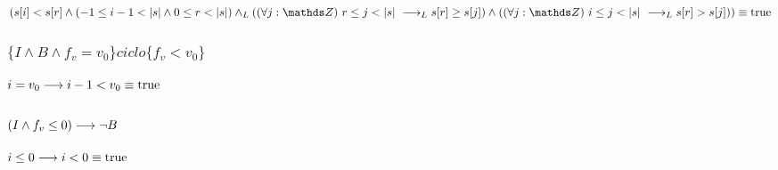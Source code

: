 \documentclass{article}
\begin{document}
$ ( s[i] < s[r] \wedge (-1 \leq i-1 < \longitud{s} \wedge 0 \leq r < \longitud{s}) \yLuego (\paraTodo{j}{r}{\longitud{s}} \implicaLuego s[r] \geq s[j]) \wedge (\paraTodo{j}{i}{\longitud{s}}\implicaLuego s[r] > s[j]) )  \equiv \True$

\subsubsection*{$ \{I \wedge B \wedge f_{v}=v_{0}\} ciclo \{f_{v}<v_{0}\} $}

    $i =v_{0} \longrightarrow i - 1 < v_{0} \equiv \mathrm{true} $

\subsubsection*{$ (I \wedge f_{v} \leq 0) \longrightarrow \neg B$}

    $i \leq 0 \longrightarrow i < 0 \equiv \mathrm{true}$
\end{document}
